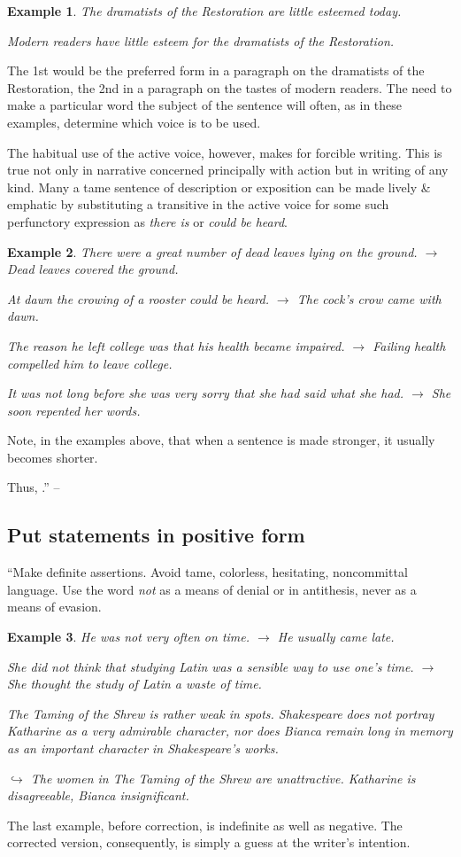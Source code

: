 \documentclass[oneside]{book}
\numberwithin{equation}{section}
\newtheorem{example}{Example}[chapter]
\begin{document}
\begin{example}
	The dramatists of the Restoration are little esteemed today.
	
	Modern readers have little esteem for the dramatists of the Restoration.
\end{example}
The 1st would be the preferred form in a paragraph on the dramatists of the Restoration, the 2nd in a paragraph on the tastes of modern readers. The need to make a particular word the subject of the sentence will often, as in these examples, determine which voice is to be used.

The habitual use of the active voice, however, makes for forcible writing. This is true not only in narrative concerned principally with action but in writing of any kind. Many a tame sentence of description or exposition can be made lively \& emphatic by substituting a transitive in the active voice for some such perfunctory expression as \textit{there is} or \textit{could be heard}.

\begin{example}
	There were a great number of dead leaves lying on the ground. $\to$ Dead leaves covered the ground.
	
	At dawn the crowing of a rooster could be heard. $\to$ The cock's crow came with dawn.
	
	The reason he left college was that his health became impaired. $\to$ Failing health compelled him to leave college.
	
	It was not long before she was very sorry that she had said what she had. $\to$ She soon repented her words.
\end{example}
Note, in the examples above, that when a sentence is made stronger, it usually becomes shorter.

Thus, .'' --  \cite[Chap. 2, Sect. 14, p. 32]{Strunk_White2019}

\subsection{Put statements in positive form}
``Make definite assertions. Avoid tame, colorless, hesitating, noncommittal language. Use the word \textit{not} as a means of denial or in antithesis, never as a means of evasion.

\begin{example}
	He was not very often on time. $\to$ He usually came late.
	
	She did not think that studying Latin was a sensible way to use one's time. $\to$ She thought the study of Latin a waste of time.
	
	\emph{The Taming of the Shrew} is rather weak in spots. Shakespeare does not portray Katharine as a very admirable character, nor does Bianca remain long in memory as an important character in Shakespeare's works.
	
	$\hookrightarrow$ The women in \emph{The Taming of the Shrew} are unattractive. Katharine is disagreeable, Bianca insignificant.
\end{example}
The last example, before correction, is indefinite as well as negative. The corrected version, consequently, is simply a guess at the writer's intention.
\end{document}
